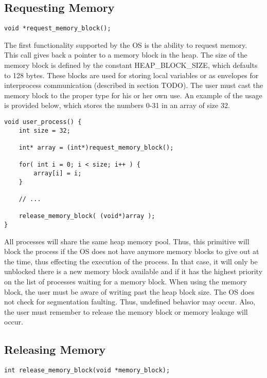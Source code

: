 \documentclass[12pt]{report}
\begin{document}
\subsection{Requesting Memory}
\begin{lstlisting}
void *request_memory_block();
\end{lstlisting}
\par The first functionality supported by the OS is the ability to request memory. This call gives back a pointer to a memory block in the heap. The size of the memory block is defined by the constant HEAP\_BLOCK\_SIZE, which defaults to 128 bytes. These blocks are used for storing local variables or as envelopes for interprocess communication (described in section TODO). The user must cast the memory block to the proper type for his or her own use. An example of the usage is provided below, which stores the numbers 0-31 in an array of size 32.
\begin{lstlisting}
void user_process() {
    int size = 32;

    int* array = (int*)request_memory_block();

    for( int i = 0; i < size; i++ ) {
        array[i] = i;
    }

    // ...

    release_memory_block( (void*)array );
}
\end{lstlisting}

\par All processes will share the same heap memory pool. Thus, this primitive will block the process if the OS does not have anymore memory blocks to give out at the time, thus effecting the execution of the process. In that case, it will only be unblocked there is a new memory block available and if it has the highest priority on the list of processes waiting for a memory block. When using the memory block, the user must be aware of writing past the heap block size. The OS does not check for segmentation faulting. Thus, undefined behavior may occur. Also, the user must remember to release the memory block or memory leakage will occur.

\bigskip

\subsection{Releasing Memory}
\begin{lstlisting}
int release_memory_block(void *memory_block);
\end{lstlisting}
\end{document}

